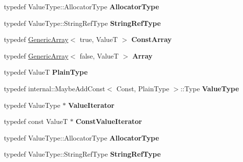 \begin{DoxyCompactItemize}
\item 
typedef Value\+Type\+::\+Allocator\+Type {\bfseries Allocator\+Type}\hypertarget{class_generic_array_af9cdc12de03c742b9c33dfc172756b97}{}\label{class_generic_array_af9cdc12de03c742b9c33dfc172756b97}

\item 
typedef Value\+Type\+::\+String\+Ref\+Type {\bfseries String\+Ref\+Type}\hypertarget{class_generic_array_a8dcb9e2a2e103ce1051c16a7486465b9}{}\label{class_generic_array_a8dcb9e2a2e103ce1051c16a7486465b9}

\item 
typedef \hyperlink{class_generic_array}{Generic\+Array}$<$ true, ValueT $>$ {\bfseries Const\+Array}\hypertarget{class_generic_array_a84f0b14518bc5cc44b4ff76a7d5ef81b}{}\label{class_generic_array_a84f0b14518bc5cc44b4ff76a7d5ef81b}

\item 
typedef \hyperlink{class_generic_array}{Generic\+Array}$<$ false, ValueT $>$ {\bfseries Array}\hypertarget{class_generic_array_a6683902e86c051c2319e873537dca7b1}{}\label{class_generic_array_a6683902e86c051c2319e873537dca7b1}

\item 
typedef ValueT {\bfseries Plain\+Type}\hypertarget{class_generic_array_aecea8be3dca6799bc523f4bffd221839}{}\label{class_generic_array_aecea8be3dca6799bc523f4bffd221839}

\item 
typedef internal\+::\+Maybe\+Add\+Const$<$ Const, Plain\+Type $>$\+::Type {\bfseries Value\+Type}\hypertarget{class_generic_array_a93e53f38a99fc5167eb2a28653de64ed}{}\label{class_generic_array_a93e53f38a99fc5167eb2a28653de64ed}

\item 
typedef Value\+Type $\ast$ {\bfseries Value\+Iterator}\hypertarget{class_generic_array_afc6ad62c3f00531fa378db266182704a}{}\label{class_generic_array_afc6ad62c3f00531fa378db266182704a}

\item 
typedef const ValueT $\ast$ {\bfseries Const\+Value\+Iterator}\hypertarget{class_generic_array_a1cd7bb3e75ccfeed3e8b0a6bb5563d68}{}\label{class_generic_array_a1cd7bb3e75ccfeed3e8b0a6bb5563d68}

\item 
typedef Value\+Type\+::\+Allocator\+Type {\bfseries Allocator\+Type}\hypertarget{class_generic_array_af9cdc12de03c742b9c33dfc172756b97}{}\label{class_generic_array_af9cdc12de03c742b9c33dfc172756b97}

\item 
typedef Value\+Type\+::\+String\+Ref\+Type {\bfseries String\+Ref\+Type}\hypertarget{class_generic_array_a8dcb9e2a2e103ce1051c16a7486465b9}{}\label{class_generic_array_a8dcb9e2a2e103ce1051c16a7486465b9}

\end{DoxyCompactItemize}
